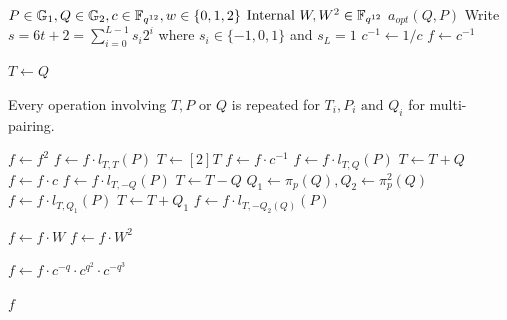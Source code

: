 \begin{algorithm}[!h]
\caption{Optimal Ate pairing with Residue witness check}
\label{alg:pairing}
\begin{algorithmic}[1]
\Require $P \in \mathbb{G}_1, Q \in \mathbb{G}_2, c \in \mathbb{F}_{q^{12}}, w \in \{0,1,2\}$
\Statex $\text{Internal } W, W^2 \in \mathbb{F}_{q^{12}}$ 
\Ensure $a_{opt}(Q, P)$
\State Write $s = 6t + 2 = \sum_{i=0}^{L-1} s_i 2^i$ where $s_i \in \{-1, 0, 1\}$ and $s_L = 1$
\State $c^{-1} \leftarrow 1 / c$ 
\State $f \leftarrow c^{-1}$ 

\State $T \leftarrow Q$ 

\color{gray}
\Statex \small{Every operation involving $T, P \text{ or } Q$ is repeated for $T_i, P_i \text{ and } Q_i$ for multi-pairing.}
\color{black}

\Statex

    \State $f \leftarrow f^2$ \label{pr:ml:sq}
    \State $f \leftarrow f \cdot l_{T,T}(P)$   \label{pr:ml:ldbl}
    \State $T \leftarrow [2]T$ 
        \State $f \leftarrow f \cdot c^{-1}$ \label{pr:ml:rw1bit}
        \State $f \leftarrow f \cdot l_{T,Q}(P)$ \label{pr:ml:ladd1bit}
        \State $T \leftarrow T + Q$ 
        \State $f \leftarrow f \cdot c$ \label{pr:ml:rw-1bit}
        \State $f \leftarrow f \cdot l_{T,-Q}(P)$ \label{pr:ml:ladd-1bit}
        \State $T \leftarrow T - Q$ 
    \EndIf
\EndFor
\Statex
\State $Q_1 \leftarrow \pi_p(Q), Q_2 \leftarrow \pi_p^2(Q)$ 
\State $f \leftarrow f \cdot l_{T,Q_1}(P)$ \label{pr:ml:pi1}
\State $T \leftarrow T + Q_1$  
\State $f \leftarrow f \cdot l_{T,-Q_2(Q)}(P)$ \label{pr:ml:pi2}

    \State $f \leftarrow f \cdot W$ \label{pr:ml:27r}
    \State $f \leftarrow f \cdot W^2$ \label{pr:ml:27r2}
\EndIf

\State $f \leftarrow f \cdot c^{-q} \cdot c^{q^2} \cdot c^{-q^3}$ \label{pr:ml:fe}

\Statex

\State \Return $f$
\end{algorithmic}
\end{algorithm}

